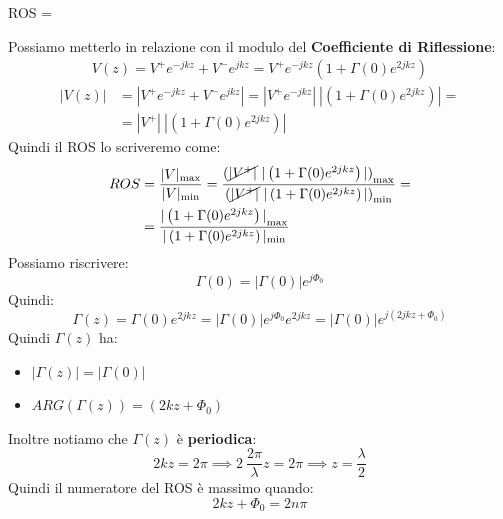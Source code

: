\begin{squared}[yellow]
    ROS = 
\end{squared}
Possiamo metterlo in relazione con il modulo del \textbf{Coefficiente di Riflessione}:
\begin{equation*}
    \begin{aligned}
    V(z) = V^+ e^{-jkz} + V^- e^{jkz} = V^+ e^{-jkz} \left(1 + \Gamma(0) e^{2jkz}\right) 
    \end{aligned}
\end{equation*}
\begin{equation*}
    \begin{aligned}
    |V(z)| &= |V^+ e^{-jkz} + V^- e^{jkz}| = |V^+ e^{-jkz}| \ |\left(1 + \Gamma(0) e^{2jkz}\right)| = \\
    &=|V^+| \ |\left(1 + \Gamma(0) e^{2jkz}\right)| 
    \end{aligned}
\end{equation*}
Quindi il ROS lo scriveremo come:
\begin{equation*}
\begin{aligned}
    ROS &= \frac{|V|_{\max}}{|V|_{\min}} = \frac{{(\cancel{|V^+|} \ |\left(1 + \Gamma(0) e^{2jkz}\right)|)}_{\max}}{{(\cancel{|V^+|} \ |\left(1 + \Gamma(0) e^{2jkz}\right)|)}_{\min}} = \\
    &= \frac{{|\left(1 + \Gamma(0) e^{2jkz}\right)|}_{\max}}{|\left(1 + \Gamma(0) e^{2jkz}\right)|_{\min}}
\end{aligned}
\end{equation*}
Possiamo riscrivere:
\begin{equation*}
    \Gamma(0) = |\Gamma(0)| e^{j \Phi_0}
\end{equation*}
Quindi:
\begin{equation*}
    \Gamma(z) = \Gamma(0) e^{2jkz} = |\Gamma(0)| e^{j \Phi_0} e^{2jkz} = |\Gamma(0)| e^{j(2jkz + \Phi_0)} 
\end{equation*}
Quindi $\Gamma(z)$ ha:
\begin{itemize}
    \item $|\Gamma(z)| = |\Gamma(0)|$
    \item $ARG(\Gamma(z)) = (2kz + \Phi_0)$
\end{itemize}
Inoltre notiamo che $\Gamma(z)$ è \textbf{periodica}:
\begin{equation*}
    2kz = 2\pi \implies 2 \ \frac{2\pi}{\lambda} z = 2\pi \implies z = \frac{\lambda}{2}
\end{equation*}
Quindi il numeratore del ROS è massimo quando:
\begin{equation*}
    2kz + \Phi_0 = 2n\pi
\end{equation*}
